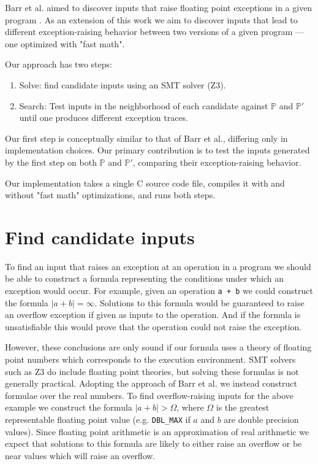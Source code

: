 \documentclass{article}
\begin{document}
\maketitle

Barr et al. aimed to discover inputs that raise floating point exceptions
in a given program \cite{barr_automatic_2013}. As an extension of this work we
aim to discover inputs that lead to different exception-raising behavior between
two versions of a given program — one optimized with "fast math".

Our approach has two steps:
\begin{enumerate}
  \item Solve: find candidate inputs using an SMT solver (Z3).
  \item Search: Test inputs in the neighborhood of each candidate against
    $\mathbb{P}$ and $\mathbb{P'}$ until one produces different exception
    traces.
\end{enumerate}

Our first step is conceptually similar to that of Barr et al., differing
only in implementation choices. Our primary contribution is to test the inputs
generated by the first step on both $\mathbb{P}$ and $\mathbb{P'}$, comparing
their exception-raising behavior.

Our implementation takes a single C source code file, compiles it with and
without "fast math" optimizations, and runs both steps.

\section{Find candidate inputs}

To find an input that raises an exception at an operation in a program we should
be able to construct a formula representing the conditions under which an
exception would occur. For example, given an operation \texttt{a + b} we could
construct the formula $|a + b| = \infty$. Solutions to this formula would be
guaranteed to raise an overflow exception if given as inputs to the operation.
And if the formula is unsatisfiable this would prove that the operation could
not raise the exception.

However, these conclusions are only sound if our formula uses a theory of
floating point numbers which corresponds to the execution environment. SMT
solvers such as Z3 do include floating point theories, but solving these
formulas is not generally practical. Adopting the approach of Barr et al. we
instead construct formulae over the real numbers. To find overflow-raising
inputs for the above example we construct the formula $|a + b| > \Omega$, where
$\Omega$ is the greatest representable floating point value (e.g.
\texttt{DBL\_MAX} if $a$ and $b$ are double precision values). Since floating
point arithmetic is an approximation of real arithmetic we expect that solutions
to this formula are likely to either raise an overflow or be near values which
will raise an overflow.
\end{document}

